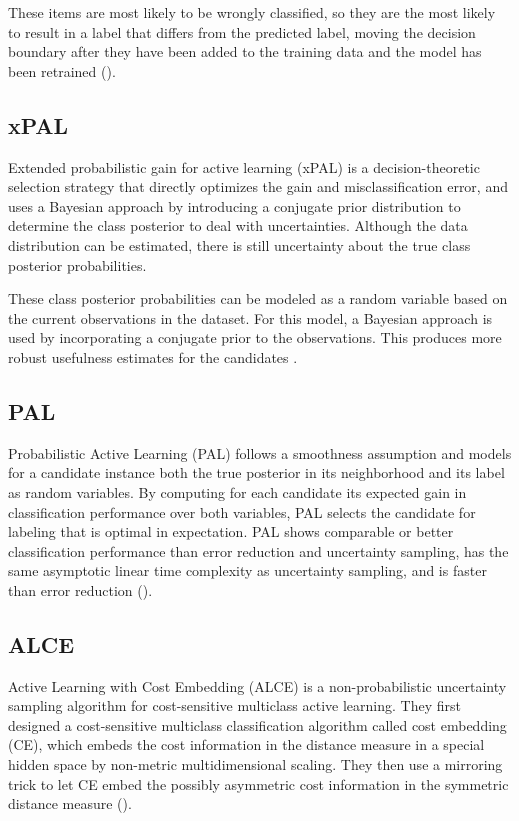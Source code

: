 These items are most likely to be wrongly classified, so they are the most likely to result in a label that differs from the predicted label, moving the decision boundary after they have been added to the training data and the model has been retrained (\cite{munro2021human}).

\subsection{xPAL}
Extended probabilistic gain for active learning (xPAL) is a decision-theoretic selection strategy that directly optimizes the gain and misclassification error, and uses a Bayesian approach by introducing a conjugate prior distribution to determine the class posterior to deal with uncertainties. Although the data distribution can be estimated, there is still uncertainty about the true class posterior probabilities. 

These class posterior probabilities can be modeled as a random variable based on the current observations in the dataset. For this model, a Bayesian approach is used by incorporating a conjugate prior to the observations. This produces more robust usefulness estimates for the candidates \cite{kottke2021toward}.

\subsection{PAL}
Probabilistic Active Learning (PAL) follows a smoothness assumption and models for a candidate instance both the true posterior in its neighborhood and its label as random variables. By computing for each candidate its expected gain in classification performance over both variables, PAL selects the candidate for labeling that is optimal in expectation. PAL shows comparable or better classification performance than error reduction and uncertainty sampling, has the same asymptotic linear time complexity as uncertainty sampling, and is faster than error reduction (\cite{kottke2014pal}).

\subsection{ALCE}
Active Learning with Cost Embedding (ALCE) is a non-probabilistic uncertainty sampling algorithm for cost-sensitive multiclass active learning. They first designed a cost-sensitive multiclass classification algorithm called cost embedding (CE), which embeds the cost information in the distance measure in a special hidden space by non-metric multidimensional scaling. They then use a mirroring trick to let CE embed the possibly asymmetric cost information in the symmetric distance measure (\cite{huang2016alce}).

